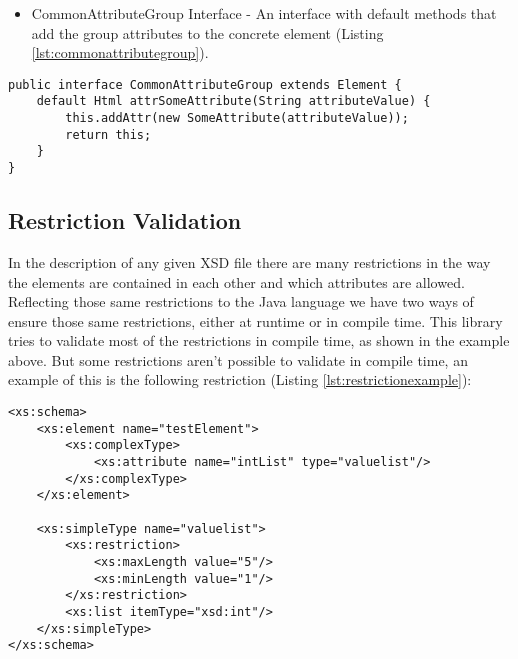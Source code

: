\begin{itemize}
	\item CommonAttributeGroup Interface - An interface with default methods that add the group attributes to the concrete element (Listing \ref{lst:commonattributegroup}).
\end{itemize}

\bigskip


\begin{minipage}{\linewidth}
\begin{lstlisting}[caption={CommonAttributeGroup Interface},captionpos=b,label={lst:commonattributegroup}]
public interface CommonAttributeGroup extends Element {
    default Html attrSomeAttribute(String attributeValue) {
        this.addAttr(new SomeAttribute(attributeValue));
        return this;
    }
}
\end{lstlisting}
\end{minipage}


\subsection{Restriction Validation}
\label{sec:restrictionvalidation}

In the description of any given \ac{XSD} file there are many restrictions in the way the elements are contained in each other and which attributes are allowed. Reflecting those same restrictions to the Java language we have two ways of ensure those same restrictions, either at runtime or in compile time. This library tries to validate most of the restrictions in compile time, as shown in the example above. But some restrictions aren't possible to validate in compile time, an example of this is the following restriction (Listing \ref{lst:restrictionexample}):

\bigskip


\begin{minipage}{\linewidth}
\begin{lstlisting}[caption={Restrictions Example},captionpos=b,label={lst:restrictionexample}]
<xs:schema>
    <xs:element name="testElement">
        <xs:complexType>
            <xs:attribute name="intList" type="valuelist"/>
        </xs:complexType>
    </xs:element>
    
    <xs:simpleType name="valuelist">
        <xs:restriction>
            <xs:maxLength value="5"/>
            <xs:minLength value="1"/>
        </xs:restriction>
        <xs:list itemType="xsd:int"/>
    </xs:simpleType>
</xs:schema>
\end{lstlisting}
\end{minipage}

